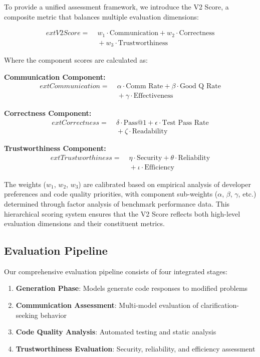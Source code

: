 \documentclass[conference]{IEEEtran}
\begin{document}
To provide a unified assessment framework, we introduce the V2 Score, a composite metric that balances multiple evaluation dimensions:

\begin{align}
    	ext{V2 Score} =
    &\; w_1 \cdot \text{Communication}
    + w_2 \cdot \text{Correctness} \\
    &\; + w_3 \cdot \text{Trustworthiness}
\end{align}

Where the component scores are calculated as:

\textbf{Communication Component:}
\begin{align}
    	ext{Communication} =
    &\; \alpha \cdot \text{Comm Rate}
    + \beta \cdot \text{Good Q Rate} \\
    &\; + \gamma \cdot \text{Effectiveness}
\end{align}

\textbf{Correctness Component:}
\begin{align}
    	ext{Correctness} =
    &\; \delta \cdot \text{Pass@1}
    + \epsilon \cdot \text{Test Pass Rate} \\
    &\; + \zeta \cdot \text{Readability}
\end{align}

\textbf{Trustworthiness Component:}
\begin{align}
    	ext{Trustworthiness} =
    &\; \eta \cdot \text{Security}
    + \theta \cdot \text{Reliability} \\
    &\; + \iota \cdot \text{Efficiency}
\end{align}

The weights ($w_1$, $w_2$, $w_3$) are calibrated based on empirical analysis of developer preferences and code quality priorities, with component sub-weights ($\alpha$, $\beta$, $\gamma$, etc.) determined through factor analysis of benchmark performance data. This hierarchical scoring system ensures that the V2 Score reflects both high-level evaluation dimensions and their constituent metrics.

\subsection{Evaluation Pipeline}

Our comprehensive evaluation pipeline consists of four integrated stages:

\begin{enumerate}
    \item \textbf{Generation Phase}: Models generate code responses to modified problems
    \item \textbf{Communication Assessment}: Multi-model evaluation of clarification-seeking behavior
    \item \textbf{Code Quality Analysis}: Automated testing and static analysis
    \item \textbf{Trustworthiness Evaluation}: Security, reliability, and efficiency assessment
\end{enumerate}
\end{document}
